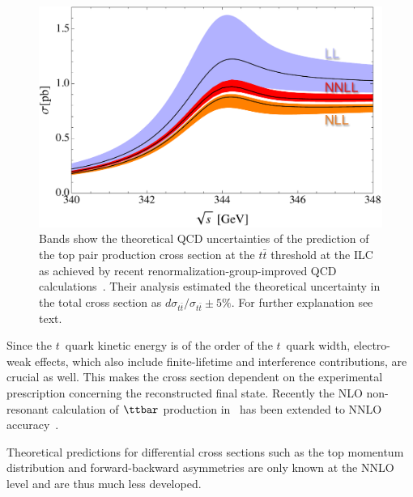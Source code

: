 \begin{figure}
\centering
\includegraphics[width=0.7\columnwidth]{TotCrossCombined.pdf}
\caption{
Bands show the theoretical QCD uncertainties of the prediction of the top pair production cross section at the $t\bar t$ threshold
   at the ILC as achieved by recent renormalization-group-improved QCD calculations~\cite{Hoang:2013uda}. Their analysis estimated 
   the theoretical uncertainty in the total cross section as $d\sigma_{t\bar t}/\sigma_{t\bar t}\pm 5\%$. For further explanation see text.
}
\label{fig:tthresh-hs}
\end{figure}


Since the $t$~quark kinetic energy is of the order of the $t$~quark width, 
electro-weak effects, which also include finite-lifetime and interference 
contributions, are crucial as well. This makes the cross section dependent 
on the experimental prescription concerning the reconstructed final state. 
Recently the NLO non-resonant calculation of $\ttbar$ production in~\cite{Beneke:2010mp,Penin:2011gg} has been extended to NNLO accuracy~\cite{Hoang:2010gu,Jantzen:2013gpa}.

Theoretical predictions for differential cross sections such as the 
top momentum distribution and forward-backward 
asymmetries are only known at the NNLO level 
and are thus much less developed.

